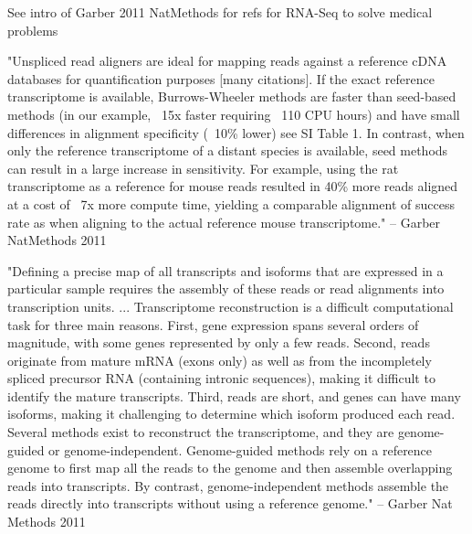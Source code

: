 \documentclass[10pt]{article}
\begin{document}
See intro of Garber 2011 NatMethods for refs for RNA-Seq to solve medical problems

"Unspliced read aligners are ideal for mapping reads against a reference cDNA databases for quantification purposes [many citations].  If the exact reference transcriptome is available, Burrows-Wheeler methods are faster than seed-based methods (in our example, ~15x faster requiring ~110 CPU hours) and have small differences in alignment specificity (~10\% lower) see SI Table 1.  In contrast, when only the reference transcriptome of a distant species is available, seed methods can result in a large increase in sensitivity.  For example, using the rat transcriptome as a reference for mouse reads resulted in 40\% more reads aligned at a cost of ~7x more compute time, yielding a comparable alignment of success rate as when aligning to the actual reference mouse transcriptome."  -- Garber NatMethods 2011

"Defining a precise map of all transcripts and isoforms that are expressed in a particular sample requires the assembly of these reads or read alignments into transcription units.  ... Transcriptome reconstruction is a difficult computational task for three main reasons.  First, gene expression spans several orders of magnitude, with some genes represented by only a few reads.  Second, reads originate from mature mRNA (exons only) as well as from the incompletely spliced precursor RNA (containing intronic sequences), making it difficult to identify the mature transcripts.  Third, reads are short, and genes can have many isoforms, making it challenging to determine which isoform produced each read.  Several methods exist to reconstruct the transcriptome, and they are genome-guided or genome-independent.  Genome-guided methods rely on a reference genome to first map all the reads to the genome and then assemble overlapping reads into transcripts.  By contrast, genome-independent methods assemble the reads directly into transcripts without using a reference genome." -- Garber Nat Methods 2011
\end{document}
